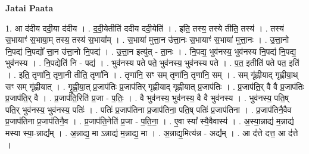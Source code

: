 \documentclass[17pt]{extarticle}
\begin{document}
\textbf{Jatai Paata} \newline

1. आ द॑दीय ददी॒या द॑दीय । . द॒दी॒येतीति॑ ददीय ददी॒येति॑ । . इति॒ तस्य॒ तस्ये तीति॒ तस्य॑ । . तस्य॑ स॒भायाꣳ॑ स॒भाया॒म् तस्य॒ तस्य॑ स॒भाया᳚म् । . स॒भाया॑ मुत्ता॒न उ॑त्ता॒नः स॒भायाꣳ॑ स॒भाया॑ मुत्ता॒नः । . उ॒त्ता॒नो नि॒पद्य॑ नि॒पद्यो᳚ त्ता॒न उ॑त्ता॒नो नि॒पद्य॑ । . उ॒त्ता॒न इत्यु॑त् - ता॒नः । . नि॒पद्य॒ भुव॑नस्य॒ भुव॑नस्य नि॒पद्य॑ नि॒पद्य॒ भुव॑नस्य । . नि॒पद्येति॑ नि - पद्य॑ । . भुव॑नस्य पते पते॒ भुव॑नस्य॒ भुव॑नस्य पते । . प॒त॒ इतीति॑ पते पत॒ इति॑ । . इति॒ तृणा॑नि॒ तृणा॒नी तीति॒ तृणा॑नि । . तृणा॑नि॒ सꣳ सम् तृणा॑नि॒ तृणा॑नि॒ सम् । . सम् गृ॑ह्णीयाद् गृह्णीया॒थ् सꣳ सम् गृ॑ह्णीयात् । . गृ॒ह्णी॒या॒त् प्र॒जाप॑तिः प्र॒जाप॑तिर् गृह्णीयाद् गृह्णीयात् प्र॒जाप॑तिः । . प्र॒जाप॑ति॒र् वै वै प्र॒जाप॑तिः प्र॒जाप॑ति॒र् वै । . प्र॒जाप॑ति॒रिति॑ प्र॒जा - प॒तिः॒ । . वै भुव॑नस्य॒ भुव॑नस्य॒ वै वै भुव॑नस्य । . भुव॑नस्य॒ पति॒ष् पति॒र् भुव॑नस्य॒ भुव॑नस्य॒ पतिः॑ । . पतिः॑ प्र॒जाप॑तिना प्र॒जाप॑तिना॒ पति॒ष् पतिः॑ प्र॒जाप॑तिना । . प्र॒जाप॑तिनै॒वैव प्र॒जाप॑तिना प्र॒जाप॑तिनै॒व । . प्र॒जाप॑ति॒नेति॑ प्र॒जा - प॒ति॒ना॒ । . ए॒वा स्या᳚ स्यै॒वैवास्य॑ । . अ॒स्या॒न्नाद्य॑ म॒न्नाद्य॑ मस्या स्या॒-न्नाद्य᳚म् । . अ॒न्नाद्य॒ मा ऽन्नाद्य॑ म॒न्नाद्य॒ मा । . अ॒न्नाद्य॒मित्य॑न्न - अद्य᳚म् । . आ द॑त्ते दत्त॒ आ द॑त्ते । \newline
\end{document}
